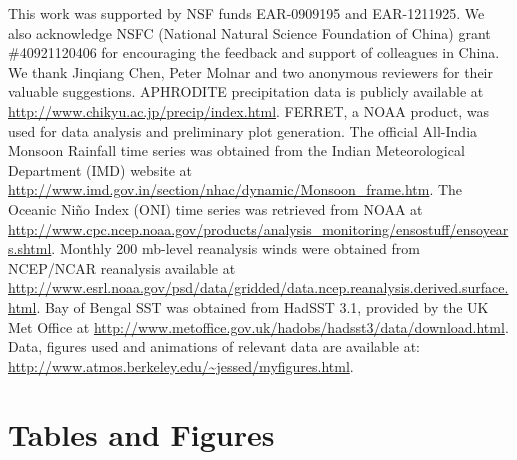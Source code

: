 	This work was supported by NSF funds EAR-0909195 and EAR-1211925. We also acknowledge NSFC (National Natural Science Foundation of China) grant \#40921120406 for encouraging the feedback and support of colleagues in China. We thank Jinqiang Chen, Peter Molnar and two anonymous reviewers for their valuable suggestions. APHRODITE precipitation data is publicly available at \url{http://www.chikyu.ac.jp/precip/index.html}. FERRET, a NOAA product, was used for data analysis and preliminary plot generation. The official All-India Monsoon Rainfall time series was obtained from the Indian Meteorological Department (IMD) website at \url{http://www.imd.gov.in/section/nhac/dynamic/Monsoon_frame.htm}. The Oceanic Ni\~no Index (ONI) time series was retrieved from NOAA at \url{http://www.cpc.ncep.noaa.gov/products/analysis_monitoring/ensostuff/ensoyears.shtml}. Monthly 200 mb-level reanalysis winds were obtained from NCEP/NCAR reanalysis available at \url{http://www.esrl.noaa.gov/psd/data/gridded/data.ncep.reanalysis.derived.surface.html}. Bay of Bengal SST was obtained from HadSST 3.1, provided by the UK Met Office at \url{http://www.metoffice.gov.uk/hadobs/hadsst3/data/download.html}. Data, figures used and animations of relevant data are available at: \url{http://www.atmos.berkeley.edu/~jessed/myfigures.html}.
	
\newpage	
\section{Tables and Figures}

